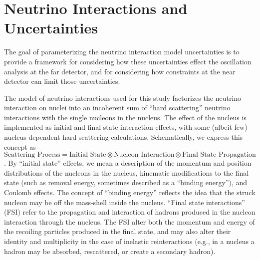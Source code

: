 \section{Neutrino Interactions and Uncertainties}\label{sec:nu-osc-05} \label{sec:physics-lbnosc-nuint}


 
The goal of parameterizing the neutrino interaction model uncertainties is to provide a framework for considering how these uncertainties effect the oscillation analysis at the far detector, and for considering how constraints at the near detector can limit those uncertainties.
 
The model of neutrino interactions used for this study factorizes the neutrino
interaction on nuclei into an incoherent sum of ``hard scattering'' neutrino interactions with the single nucleons in the nucleus. The effect of the nucleus is implemented as
initial and final state interaction effects, with some (albeit few) nucleus-dependent hard scattering calculations. Schematically, we express this concept as $\text{Scattering Process} = \text{Initial State} \otimes \text{Nucleon Interaction} \otimes \text{Final State Propagation}$.  By ``initial state'' effects, we  mean a description of the momentum and position distributions of the nucleons in the nucleus, kinematic modifications to the final state (such as removal energy, sometimes described as a ``binding energy''), and Coulomb effects.   The concept of ``binding energy'' reflects the idea that the struck nucleon may be off the mass-shell inside the nucleus.  ``Final state interactions'' (FSI) refer to the propagation and interaction of hadrons produced in the nucleon interaction through the nucleus. The FSI alter both the momentum and energy of the recoiling particles produced in the final state, and may also alter their identity and multiplicity in the case of inelastic reinteractions (e.g., in a nucleus a hadron may be absorbed, rescattered, or create a secondary hadron). 

